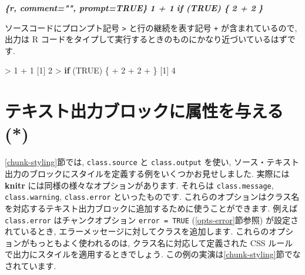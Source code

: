 \documentclass[
  11pt,
  lualatex,ja=standard,jafont=noto]{bxjsreport}
\newenvironment{Shaded}{\begin{snugshade}}{\end{snugshade}}
\newcommand{\ConstantTok}[1]{\textcolor[rgb]{0.00,0.00,0.00}{#1}}
\newcommand{\ControlFlowTok}[1]{\textcolor[rgb]{0.13,0.29,0.53}{\textbf{#1}}}
\newcommand{\DecValTok}[1]{\textcolor[rgb]{0.00,0.00,0.81}{#1}}
\newcommand{\InformationTok}[1]{\textcolor[rgb]{0.56,0.35,0.01}{\textbf{\textit{#1}}}}
\newcommand{\NormalTok}[1]{#1}
\newcommand{\SpecialCharTok}[1]{\textcolor[rgb]{0.00,0.00,0.00}{#1}}
\begin{document}
\begin{Shaded}
\begin{Highlighting}[]
\InformationTok{\textasciigrave{}\textasciigrave{}\textasciigrave{}\{r, comment="", prompt=TRUE\}}
\InformationTok{1 + 1}
\InformationTok{if (TRUE) \{}
\InformationTok{  2 + 2}
\InformationTok{\}}
\InformationTok{\textasciigrave{}\textasciigrave{}\textasciigrave{}}
\end{Highlighting}
\end{Shaded}

ソースコードにプロンプト記号 \texttt{\textgreater{}} と行の継続を表す記号 \texttt{+} が含まれているので, 出力は R コードをタイプして実行するときのものにかなり近づいているはずです.

\begin{Shaded}
\begin{Highlighting}[numbers=left,,]
\SpecialCharTok{\textgreater{}} \DecValTok{1} \SpecialCharTok{+} \DecValTok{1}
\NormalTok{[}\DecValTok{1}\NormalTok{] }\DecValTok{2}
\SpecialCharTok{\textgreater{}} \ControlFlowTok{if}\NormalTok{ (}\ConstantTok{TRUE}\NormalTok{) \{}
\SpecialCharTok{+}   \DecValTok{2} \SpecialCharTok{+} \DecValTok{2}
\SpecialCharTok{+}\NormalTok{ \}}
\NormalTok{[}\DecValTok{1}\NormalTok{] }\DecValTok{4}
\end{Highlighting}
\end{Shaded}

\hypertarget{attr-output}{%
\section{テキスト出力ブロックに属性を与える (*)}\label{attr-output}}

\ref{chunk-styling}節では, \texttt{class.source} と \texttt{class.output} を使い, ソース・テキスト出力のブロックにスタイルを定義する例をいくつかお見せしました. 実際には \textbf{knitr} には同様の様々なオプションがあります. それらは \texttt{class.message}, \texttt{class.warning}, \texttt{class.error} といったものです. これらのオプションはクラス名を対応するテキスト出力ブロックに追加するために使うことができます. 例えば \texttt{class.error} はチャンクオプション \texttt{error = TRUE} (\ref{opts-error}節参照) が設定されているとき, エラーメッセージに対してクラスを追加します. これらのオプションがもっともよく使われるのは, クラス名に対応して定義された CSS ルールで出力にスタイルを適用するときでしょう. この例の実演は\ref{chunk-styling}節でなされています.
\end{document}
